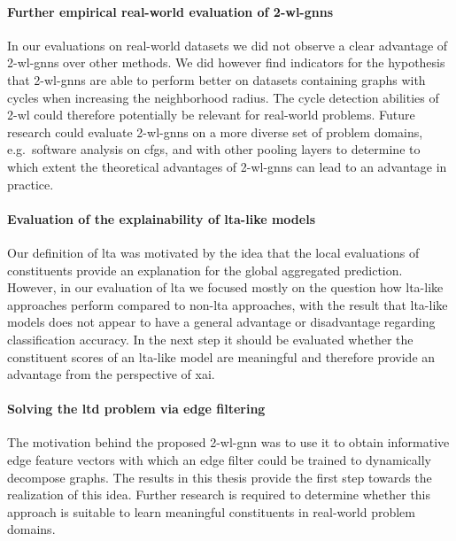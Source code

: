 \paragraph{Further empirical real-world evaluation of 2-\acs{wl}-\acsp{gnn}}
In our evaluations on real-world datasets we did not observe a clear advantage of 2-\acs{wl}-\acsp{gnn} over other methods.
We did however find indicators for the hypothesis that 2-\acs{wl}-\acsp{gnn} are able to perform better on datasets containing graphs with cycles when increasing the neighborhood radius.
The cycle detection abilities of 2-\acs{wl} could therefore potentially be relevant for real-world problems.
Future research could evaluate 2-\acs{wl}-\acsp{gnn} on a more diverse set of problem domains, e.g.\ software analysis on \acfp{cfg}, and with other pooling layers to determine to which extent the theoretical advantages of 2-\acs{wl}-\acsp{gnn} can lead to an advantage in practice.

\paragraph{Evaluation of the explainability of \acs{lta}-like models}
Our definition of \ac{lta} was motivated by the idea that the local evaluations of constituents provide an explanation for the global aggregated prediction.
However, in our evaluation of \ac{lta} we focused mostly on the question how \acs{lta}-like approaches perform compared to non-\acs{lta} approaches, with the result that \acs{lta}-like models does not appear to have a general advantage or disadvantage regarding classification accuracy.
In the next step it should be evaluated whether the constituent scores of an \acs{lta}-like model are meaningful and therefore provide an advantage from the perspective of \acl{xai}.

\paragraph{Solving the \ac{ltd} problem via edge filtering}
The motivation behind the proposed 2-\acs{wl}-\acs{gnn} was to use it to obtain informative edge feature vectors with which an edge filter could be trained to dynamically decompose graphs.
The results in this thesis provide the first step towards the realization of this idea.
Further research is required to determine whether this approach is suitable to learn meaningful constituents in real-world problem domains.
